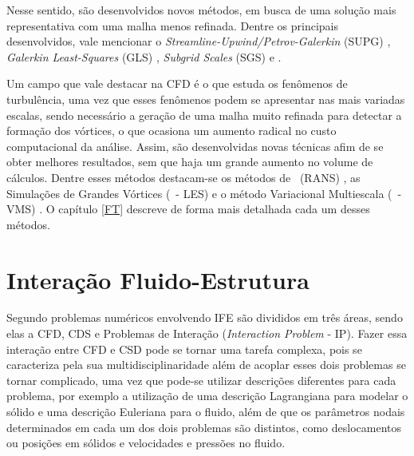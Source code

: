 \documentclass[_ArquivoPrincipal.tex]{subfiles}
\begin{document}
Nesse sentido, são desenvolvidos novos métodos, em busca de uma solução mais representativa com uma malha menos refinada. Dentre os principais desenvolvidos, vale mencionar o \textit{Streamline-Upwind/Petrov-Galerkin} (SUPG) \cite{brooks1982streamline}, \textit{Galerkin Least-Squares} (GLS) \cite{hughes1989new,tezduyar1991stabilized}, \textit{Subgrid Scales} (SGS) e \cite{hughes1995multiscale}.

Um campo que vale destacar na CFD é o que estuda os fenômenos de turbulência, uma vez que esses fenômenos podem se apresentar nas mais variadas escalas, sendo necessário a geração de uma malha muito refinada para detectar a formação dos vórtices, o que ocasiona um aumento radical no custo computacional da análise. Assim, são desenvolvidas novas técnicas afim de se obter melhores resultados, sem que haja um grande aumento no volume de cálculos. Dentre esses métodos destacam-se os métodos de \RANS\ (RANS) \cite{speziale1991analytical,alfonsi2009reynolds,ling2015evaluation}, as Simulações de Grandes Vórtices (\LES\ - LES) \cite{germano1991dynamic,piomelli1999large,hughes2000large,vsekutkovski2021partitioned} e o método Variacional Multiescala (\VMS\ - VMS) \cite{hughes1995multiscale,hughes1998variational,hughes2002variational,bazilevs2010large,bazilevs2013computational}. O capítulo \ref{FT} descreve de forma mais detalhada cada um desses métodos.


\section{Interação Fluido-Estrutura} \label{IFE}

Segundo  problemas numéricos envolvendo IFE são divididos em três áreas, sendo elas a CFD, CDS e Problemas de Interação (\textit{Interaction Problem} - IP). Fazer essa interação entre CFD e CSD pode se tornar uma tarefa complexa, pois se caracteriza pela sua multidisciplinaridade \cite{hou2012numerical} além de acoplar esses dois problemas se tornar complicado, uma vez que pode-se utilizar descrições diferentes para cada problema, por exemplo a utilização de uma descrição Lagrangiana para modelar o sólido e uma descrição Euleriana para o fluido, além de que os parâmetros nodais determinados em cada um dos dois problemas são distintos, como deslocamentos ou posições em sólidos e velocidades e pressões no fluido.
\end{document}

